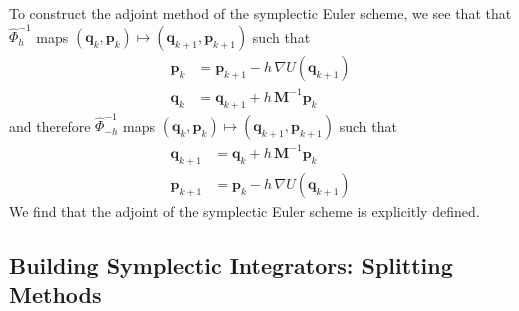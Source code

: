 \documentclass{article}
\begin{document}
      To construct the adjoint method of the symplectic Euler scheme, we see that that $\hat{\Phi}_{h}^{-1}$ maps $(\mathbf{q}_k, \mathbf{p}_k) \mapsto (\mathbf{q}_{k+1}, \mathbf{p}_{k+1})$ such that
      \begin{align*}
          \mathbf{p}_k & = \mathbf{p}_{k+1} - h \, \nabla U(\mathbf{q}_{k+1}) \\
          \mathbf{q}_k & = \mathbf{q}_{k+1} + h \, \mathbf{M}^{-1} \mathbf{p}_{k} 
      \end{align*}
      and therefore $\hat{\Phi}_{- h}^{-1}$ maps $(\mathbf{q}_k, \mathbf{p}_k) \mapsto (\mathbf{q}_{k+1}, \mathbf{p}_{k+1})$ such that
      \begin{align*}
          \mathbf{q}_{k+1} & = \mathbf{q}_k + h \, \mathbf{M}^{-1} \mathbf{p}_k \\
          \mathbf{p}_{k+1} & = \mathbf{p}_k - h \, \nabla U (\mathbf{q}_{k+1})
      \end{align*}
      We find that the adjoint of the symplectic Euler scheme is explicitly defined. 

  \subsection{Building Symplectic Integrators: Splitting Methods}
\end{document}

